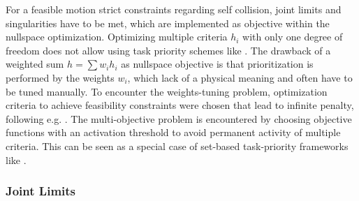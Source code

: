\documentclass[runningheads]{llncs}
\begin{document}
For a feasible motion strict constraints regarding self collision, joint limits and singularities have to be met, which are implemented as objective within the nullspace optimization.
Optimizing multiple criteria $h_i$ with only one degree of freedom does not allow using task priority schemes like \cite{NakamuraHanYos1987,LilloChiAnt2019}.
The drawback of a weighted sum $h{=}\sum w_i h_i$ as nullspace objective is that prioritization is performed by the weights $w_i$, which lack of a physical meaning and often have to be tuned manually.
To encounter the weights-tuning problem, optimization criteria to achieve feasibility constraints were chosen that lead to infinite penalty, following e.g. \cite{ZhuQuCaoYan2013}.
The multi-objective problem is encountered by choosing objective functions with an activation threshold to avoid permanent activity of multiple criteria.
This can be seen as a special case of set-based task-priority frameworks like \cite{LilloChiAnt2019}.

\subsubsection{Joint Limits}
\end{document}
